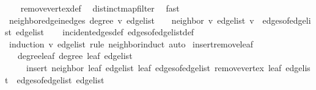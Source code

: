 \begin{isabellebody}
%
\isadelimproof
\ \ %
\endisadelimproof
%
\isatagproof
{}\isamarkupfalse%
\ remove{\isacharunderscore}{\kern0pt}vertex{\isacharunderscore}{\kern0pt}def\ \isamarkupfalse%
\ distinct{\isacharunderscore}{\kern0pt}map{\isacharunderscore}{\kern0pt}filter\ \isamarkupfalse%
\ fast%
\endisatagproof
{\isafoldproof}%
%
\isadelimproof
\isanewline
%
\endisadelimproof
\isanewline
{}\isamarkupfalse%
\ neighbor{\isacharunderscore}{\kern0pt}edge{\isacharunderscore}{\kern0pt}in{\isacharunderscore}{\kern0pt}edges{\isacharcolon}{\kern0pt}\ {\isachardoublequoteopen}degree\ v\ edge{\isacharunderscore}{\kern0pt}list\ {\isasymge}\ {}\ {\isasymLongrightarrow}\ {\isacharbraceleft}{\kern0pt}neighbor\ v\ edge{\isacharunderscore}{\kern0pt}list{\isacharcomma}{\kern0pt}\ v{\isacharbraceright}{\kern0pt}\ {\isasymin}\ edges{\isacharunderscore}{\kern0pt}of{\isacharunderscore}{\kern0pt}edge{\isacharunderscore}{\kern0pt}list\ edge{\isacharunderscore}{\kern0pt}list{\isachardoublequoteclose}\isanewline
%
\isadelimproof
\ \ %
\endisadelimproof
%
\isatagproof
{}\isamarkupfalse%
\ incident{\isacharunderscore}{\kern0pt}edges{\isacharunderscore}{\kern0pt}def\ edges{\isacharunderscore}{\kern0pt}of{\isacharunderscore}{\kern0pt}edge{\isacharunderscore}{\kern0pt}list{\isacharunderscore}{\kern0pt}def\ \isamarkupfalse%
\ {\isacharparenleft}{\kern0pt}induction\ v\ edge{\isacharunderscore}{\kern0pt}list\ rule{\isacharcolon}{\kern0pt}\ neighbor{\isachardot}{\kern0pt}induct{\isacharparenright}{\kern0pt}\ auto%
\endisatagproof
{\isafoldproof}%
%
\isadelimproof
\isanewline
%
\endisadelimproof
\isanewline
{}\isamarkupfalse%
\ insert{\isacharunderscore}{\kern0pt}remove{\isacharunderscore}{\kern0pt}leaf{\isacharcolon}{\kern0pt}\isanewline
\ \ \ degree{\isacharunderscore}{\kern0pt}leaf{\isacharcolon}{\kern0pt}\ {\isachardoublequoteopen}degree\ leaf\ edge{\isacharunderscore}{\kern0pt}list\ {\isacharequal}{\kern0pt}\ {}{\isachardoublequoteclose}\isanewline
\ \ \ \ \ {\isachardoublequoteopen}insert\ {\isacharbraceleft}{\kern0pt}neighbor\ leaf\ edge{\isacharunderscore}{\kern0pt}list{\isacharcomma}{\kern0pt}\ leaf{\isacharbraceright}{\kern0pt}\ {\isacharparenleft}{\kern0pt}edges{\isacharunderscore}{\kern0pt}of{\isacharunderscore}{\kern0pt}edge{\isacharunderscore}{\kern0pt}list\ {\isacharparenleft}{\kern0pt}remove{\isacharunderscore}{\kern0pt}vertex\ leaf\ edge{\isacharunderscore}{\kern0pt}list{\isacharparenright}{\kern0pt}{\isacharparenright}{\kern0pt}\ {\isacharequal}{\kern0pt}\ edges{\isacharunderscore}{\kern0pt}of{\isacharunderscore}{\kern0pt}edge{\isacharunderscore}{\kern0pt}list\ edge{\isacharunderscore}{\kern0pt}list{\isachardoublequoteclose}\isanewline

\end{isabellebody}
